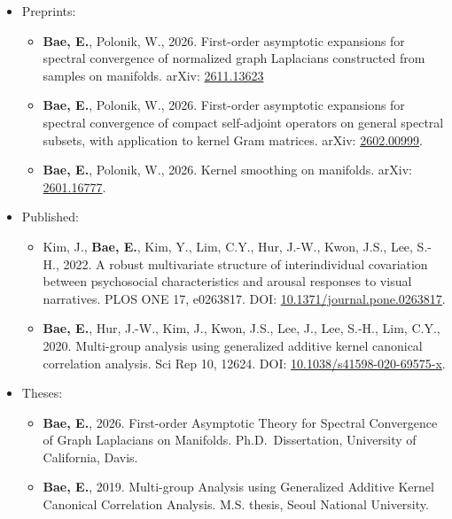 \documentclass[11pt]{article}
\providecommand{\tightlist}{}
\begin{document}
\begin{itemize}
\tightlist
\item
  Preprints:

  \begin{itemize}
  \tightlist
  \item
    \textbf{Bae, E.}, Polonik, W., 2026. First-order asymptotic
    expansions for spectral convergence of normalized graph Laplacians
    constructed from samples on manifolds. arXiv:
    \href{https://arxiv.org/abs/2611.13623}{2611.13623}
  \item
    \textbf{Bae, E.}, Polonik, W., 2026. First-order asymptotic
    expansions for spectral convergence of compact self-adjoint
    operators on general spectral subsets, with application to kernel
    Gram matrices. arXiv:
    \href{https://arxiv.org/abs/2602.00999}{2602.00999}.
  \item
    \textbf{Bae, E.}, Polonik, W., 2026. Kernel smoothing on manifolds.
    arXiv: \href{https://arxiv.org/abs/2601.16777}{2601.16777}.
  \end{itemize}
\item
  Published:

  \begin{itemize}
  \tightlist
  \item
    Kim, J., \textbf{Bae, E.}, Kim, Y., Lim, C.Y., Hur, J.-W., Kwon,
    J.S., Lee, S.-H., 2022. A robust multivariate structure of
    interindividual covariation between psychosocial characteristics and
    arousal responses to visual narratives. PLOS ONE 17, e0263817. DOI:
    \href{https://doi.org/10.1371/journal.pone.0263817}{10.1371/journal.pone.0263817}.
  \item
    \textbf{Bae, E.}, Hur, J.-W., Kim, J., Kwon, J.S., Lee, J., Lee,
    S.-H., Lim, C.Y., 2020. Multi-group analysis using generalized
    additive kernel canonical correlation analysis. Sci Rep 10, 12624.
    DOI:
    \href{https://doi.org/10.1038/s41598-020-69575-x}{10.1038/s41598-020-69575-x}.
  \end{itemize}
\item
  Theses:

  \begin{itemize}
  \tightlist
  \item
    \textbf{Bae, E.}, 2026. First-order Asymptotic Theory for Spectral
    Convergence of Graph Laplacians on Manifolds. Ph.D.~Dissertation,
    University of California, Davis.
  \item
    \textbf{Bae, E.}, 2019. Multi-group Analysis using Generalized
    Additive Kernel Canonical Correlation Analysis. M.S. thesis, Seoul
    National University.
  \end{itemize}
\end{itemize}
\end{document}
